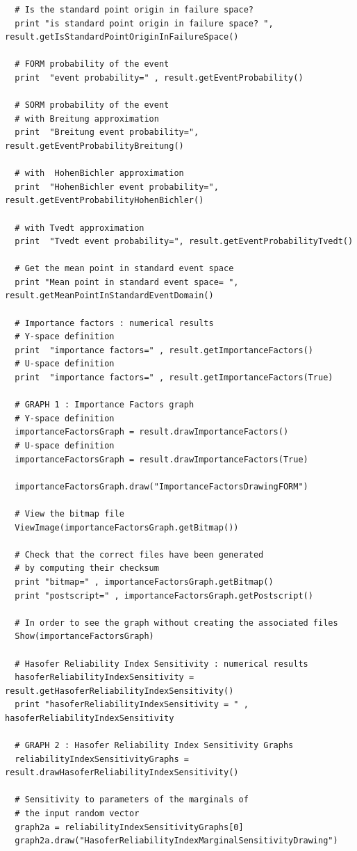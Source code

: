 \begin{lstlisting}
  # Is the standard point origin in failure space?
  print "is standard point origin in failure space? ", result.getIsStandardPointOriginInFailureSpace()

  # FORM probability of the event
  print  "event probability=" , result.getEventProbability()

  # SORM probability of the event
  # with Breitung approximation
  print  "Breitung event probability=", result.getEventProbabilityBreitung()

  # with  HohenBichler approximation
  print  "HohenBichler event probability=", result.getEventProbabilityHohenBichler()

  # with Tvedt approximation
  print  "Tvedt event probability=", result.getEventProbabilityTvedt()

  # Get the mean point in standard event space
  print "Mean point in standard event space= ", result.getMeanPointInStandardEventDomain()

  # Importance factors : numerical results
  # Y-space definition
  print  "importance factors=" , result.getImportanceFactors()
  # U-space definition
  print  "importance factors=" , result.getImportanceFactors(True)

  # GRAPH 1 : Importance Factors graph
  # Y-space definition
  importanceFactorsGraph = result.drawImportanceFactors()
  # U-space definition
  importanceFactorsGraph = result.drawImportanceFactors(True)

  importanceFactorsGraph.draw("ImportanceFactorsDrawingFORM")

  # View the bitmap file
  ViewImage(importanceFactorsGraph.getBitmap())

  # Check that the correct files have been generated
  # by computing their checksum
  print "bitmap=" , importanceFactorsGraph.getBitmap()
  print "postscript=" , importanceFactorsGraph.getPostscript()

  # In order to see the graph without creating the associated files
  Show(importanceFactorsGraph)

  # Hasofer Reliability Index Sensitivity : numerical results
  hasoferReliabilityIndexSensitivity = result.getHasoferReliabilityIndexSensitivity()
  print "hasoferReliabilityIndexSensitivity = " , hasoferReliabilityIndexSensitivity

  # GRAPH 2 : Hasofer Reliability Index Sensitivity Graphs
  reliabilityIndexSensitivityGraphs = result.drawHasoferReliabilityIndexSensitivity()

  # Sensitivity to parameters of the marginals of
  # the input random vector
  graph2a = reliabilityIndexSensitivityGraphs[0]
  graph2a.draw("HasoferReliabilityIndexMarginalSensitivityDrawing")


\end{lstlisting}
